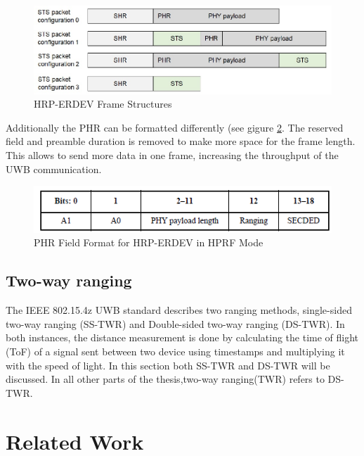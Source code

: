 \begin{figure}[ht!]
\centering
\includegraphics[width=\linewidth]{graphics/HRP_ERDEV_frame_structures.jpg}
\caption{HRP-ERDEV Frame Structures \cite{hsu_2021}}
\label{f:HRP-erdev frame}
\end{figure}

Additionally the PHR can be formatted differently (see gigure \ref{f:PHR 4z}. 
The reserved field and preamble duration is removed to make more space for the frame length. This allows to send more data in one frame, increasing the throughput of the UWB communication.

\begin{figure}[ht!]
\centering
\includegraphics[width=\linewidth]{graphics/HRP_ERDEV_HPRF_mode_PHR.png}
\caption{PHR Field Format for HRP-ERDEV in HPRF Mode \cite{IEEE4z}}
\label{f:PHR 4z}
\end{figure}


\subsection{Two-way ranging}
\label{ss:two_way_ranging}
The IEEE 802.15.4z UWB standard describes two ranging methods, single-sided two-way ranging (SS-TWR) and Double-sided two-way ranging (DS-TWR).
In both instances, the distance measurement is done by calculating the time of flight (ToF) of a signal sent between two device using timestamps and multiplying it with the speed of light. 
In this section both SS-TWR and DS-TWR will be discussed.
In all other parts of the thesis,two-way ranging(TWR) refers to DS-TWR.




\section{Related Work} %


